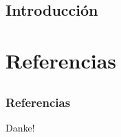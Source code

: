 \documentclass{beamer}
\begin{document}
\subsection{Introducci\'on}

\section{Referencias}
\subsection{}
\begin{frame}[allowframebreaks]
    
    \frametitle{Referencias}
    
    
\end{frame}

\begin{frame}
    \begin{center}
        {\Huge\calligra Danke!}
    \end{center}
\end{frame}
\end{document}
